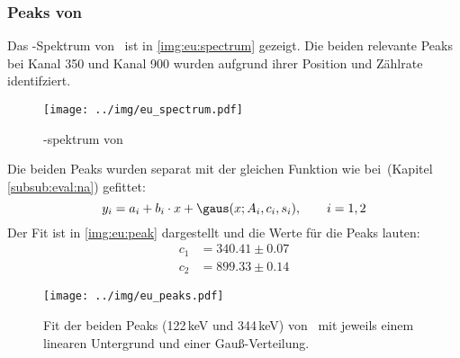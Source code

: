\subsubsection{Peaks von \eu}
\label{subsub:eval:eu}
Das \textgamma-Spektrum von \eu\, ist in \autoref{img:eu:spectrum} gezeigt. Die beiden relevante Peaks bei Kanal 350 und Kanal 900 wurden aufgrund 
ihrer Position und Zählrate identifziert.
\begin{figure}[H]
\begin{center}
  \texttt{[image: ../img/eu\_spectrum.pdf]}
  \caption{\textgamma-spektrum von }
  \label{img:eu:spectrum}
\end{center}
\end{figure}
Die beiden Peaks wurden separat mit der gleichen Funktion wie bei \na\,(Kapitel \ref{subsub:eval:na}) gefittet:
\begin{equation}
  y_i = a_i + b_i \cdot x + \gaus(x; A_i, c_i, s_i), \qquad i = 1, 2
\end{equation}
Der Fit ist in \autoref{img:eu:peak} dargestellt und die Werte für die Peaks lauten:
\begin{equation}
\begin{split}
  \label{eq:eu:peaks}
  c_1 &= 340.41 \pm 0.07 \\
  c_2 &= 899.33 \pm 0.14
\end{split}
\end{equation}
\begin{figure}[H]
\begin{center}
  \texttt{[image: ../img/eu\_peaks.pdf]}
  \caption{Fit der beiden Peaks (122\,keV und 344\,keV) von \eu\, mit jeweils einem linearen Untergrund und einer Gauß-Verteilung.}
  \label{img:eu:peak}
\end{center}
\end{figure}

